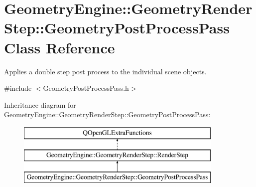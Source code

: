 \hypertarget{class_geometry_engine_1_1_geometry_render_step_1_1_geometry_post_process_pass}{}\section{Geometry\+Engine\+::Geometry\+Render\+Step\+::Geometry\+Post\+Process\+Pass Class Reference}
\label{class_geometry_engine_1_1_geometry_render_step_1_1_geometry_post_process_pass}


Applies a double step post process to the individual scene objects.  




{\ttfamily \#include $<$Geometry\+Post\+Process\+Pass.\+h$>$}

Inheritance diagram for Geometry\+Engine\+::Geometry\+Render\+Step\+::Geometry\+Post\+Process\+Pass\+:\begin{figure}[H]
\begin{center}
\leavevmode
\includegraphics[height=3.000000cm]{class_geometry_engine_1_1_geometry_render_step_1_1_geometry_post_process_pass}
\end{center}
\end{figure}
